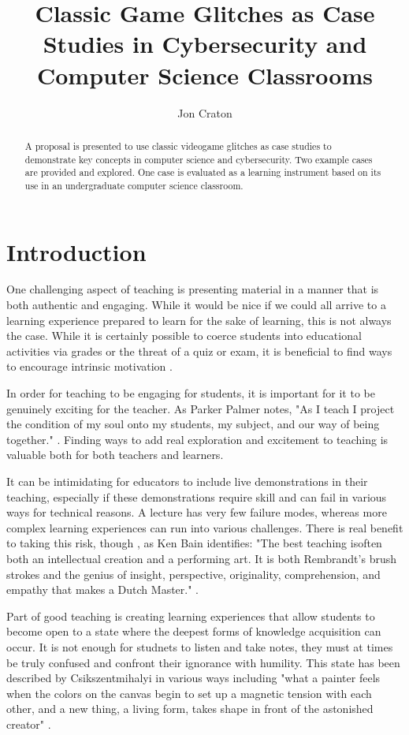 \documentclass[letterpaper]{article}
\title{Classic Game Glitches as Case Studies in Cybersecurity and Computer Science Classrooms}
\author[1]{Jon Craton}
\affil[1]{Anderson University, Anderson, IN}
\date{} %
\begin{document}
\maketitle

\begin{abstract}
A proposal is presented to use classic videogame glitches as case studies to demonstrate key concepts in computer science and cybersecurity. Two example cases are provided and explored. One case is evaluated as a learning instrument based on its use in an undergraduate computer science classroom.
\end{abstract}

\section{Introduction}
One challenging aspect of teaching is presenting material in a manner that is both authentic and engaging. While it would be nice if we could all arrive to a learning experience prepared to learn for the sake of learning, this is not always the case. While it is certainly possible to coerce students into educational activities via grades or the threat of a quiz or exam, it is beneficial to find ways to encourage intrinsic motivation \cite{deci2013intrinsic}.

In order for teaching to be engaging for students, it is important for it to be genuinely exciting for the teacher. As Parker Palmer notes, "As I teach I project the condition of my soul onto my students, my subject, and our way of being together." \cite{palmer2000courage}. Finding ways to add real exploration and excitement to teaching is valuable both for both teachers and learners.

It can be intimidating for educators to include live demonstrations in their teaching, especially if these demonstrations require skill and can fail in various ways for technical reasons. A lecture has very few failure modes, whereas more complex learning experiences can run into various challenges. There is real benefit to taking this risk, though , as Ken Bain identifies: "The best teaching isoften both an intellectual creation and a performing art. It is both Rembrandt’s brush strokes and the genius of insight, perspective, originality, comprehension, and empathy that makes a Dutch Master." \cite{bain2004best}.

Part of good teaching is creating learning experiences that allow students to become open to a state where the deepest forms of knowledge acquisition can occur. It is not enough for studnets to listen and take notes, they must at times be truly confused and confront their ignorance with humility. This state has been described by Csikszentmihalyi in various ways including  "what a painter feels when the colors on the canvas begin to set up a magnetic tension with each other, and a new thing, a living form, takes shape in front of the astonished creator" \cite{csikszentmihalyi1990flow}.
\end{document}
